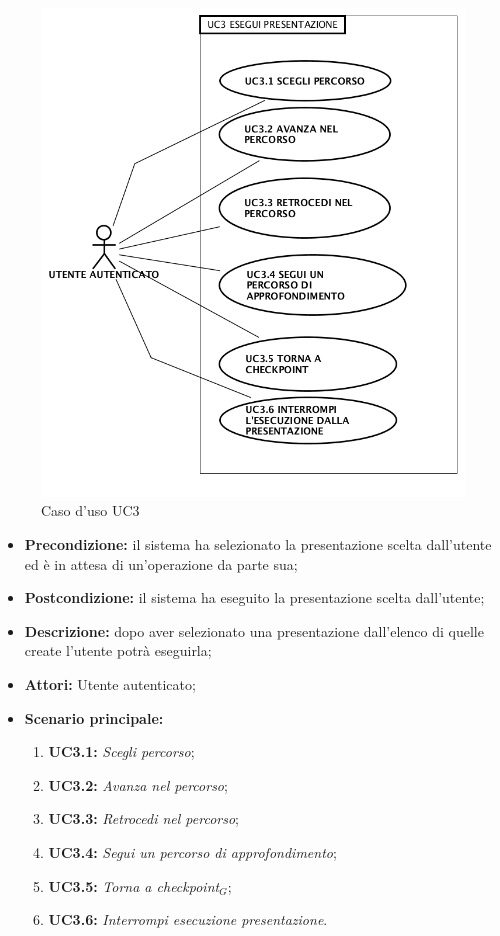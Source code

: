 \begin{figure}[h]
	\begin{center}
	\includegraphics[scale=0.4]{diagram/UC3.png}
	\caption{Caso d'uso UC3}
	\end{center}
\end{figure}
\begin{itemize}
	\item \textbf{Precondizione:} il sistema ha selezionato la presentazione scelta dall'utente ed è in attesa di un’operazione da parte sua;
	\item \textbf{Postcondizione:} il sistema ha eseguito la presentazione scelta dall'utente;
	\item \textbf{Descrizione:} dopo aver selezionato una presentazione dall'elenco di quelle create l'utente potrà eseguirla;
	\item \textbf{Attori:} Utente autenticato;
	\item \textbf{Scenario principale:}
	\begin{enumerate}
		\item \textbf{ UC3.1:} \textit{ Scegli percorso};
		\item \textbf{ UC3.2:} \textit{ Avanza nel percorso};
		\item \textbf{ UC3.3:} \textit{ Retrocedi nel percorso};
		\item \textbf{ UC3.4:} \textit{ Segui un percorso di approfondimento};
		\item \textbf{ UC3.5:} \textit{ Torna a checkpoint$_G$};
		\item \textbf{ UC3.6:} \textit{ Interrompi esecuzione presentazione}.
	\end{enumerate}
\end{itemize}
